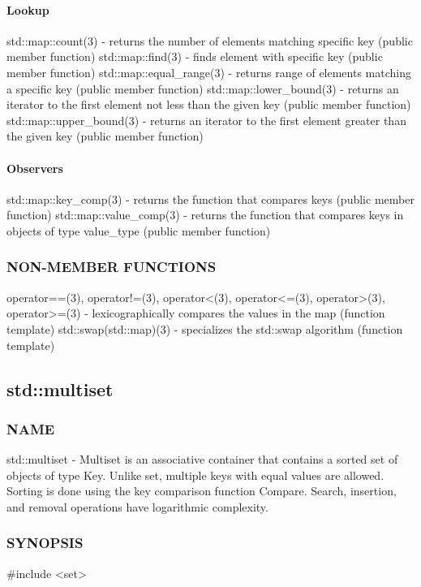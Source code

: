 \paragraph{Lookup}
std::map::count(3) - returns the number of elements matching specific key   (public member function)
std::map::find(3) - finds element with specific key  (public member function)
std::map::equal\_range(3) - returns range of elements matching a specific key  (public member function)
std::map::lower\_bound(3) - returns an iterator to the first element not less than the given key  (public member function)
std::map::upper\_bound(3) - returns an iterator to the first element greater than the given key  (public member function)
\paragraph{Observers}
std::map::key\_comp(3) - returns the function that compares keys  (public member function)
std::map::value\_comp(3) - returns the function that compares keys in objects of type value\_type  (public member function)

\subsubsection{NON-MEMBER FUNCTIONS}
operator==(3), operator!=(3), operator<(3), operator<=(3), operator>(3), operator>=(3) - lexicographically compares the values in the map   (function template)
std::swap(std::map)(3) - specializes the std::swap algorithm   (function template)


\subsection{std::multiset}

\subsubsection{NAME}
std::multiset - Multiset is an associative container that contains a sorted set of objects of type Key. Unlike set, multiple keys with equal values are allowed. Sorting is done using the key comparison function Compare. Search, insertion, and removal operations have logarithmic complexity.

\subsubsection{SYNOPSIS}
\#include <set>

